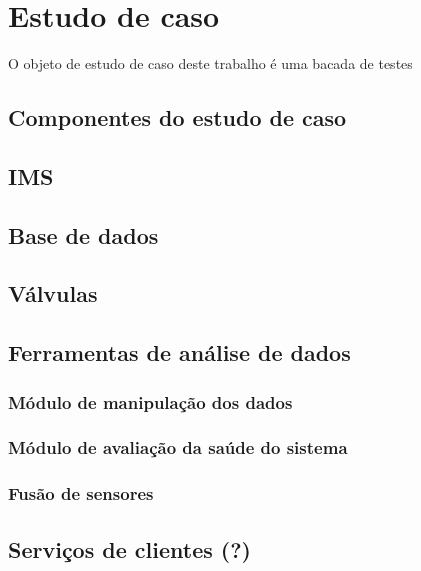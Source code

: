 \section{Estudo de caso}

O objeto de estudo de caso deste trabalho é uma bacada de testes


\subsection{Componentes do estudo de caso}


\subsection{IMS}


\subsection{Base de dados}


\subsection{Válvulas}




\subsection{Ferramentas de análise de dados}

\subsubsection{Módulo de manipulação dos dados}

\subsubsection{Módulo de avaliação da saúde do sistema}

\subsubsection{Fusão de sensores}


\subsection{Serviços de clientes (?)}


